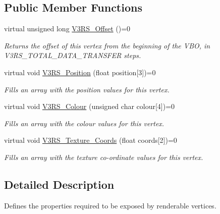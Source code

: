 \subsection*{Public Member Functions}
\begin{DoxyCompactItemize}
\item 
virtual unsigned long \hyperlink{class_i_vertex3_d_render_spec_a891d736d3d414de333398975f34bbae7}{V3\-R\-S\-\_\-\-Offset} ()=0
\begin{DoxyCompactList}\small\item\em Returns the offset of this vertex from the beginning of the V\-B\-O, in V3\-R\-S\-\_\-\-T\-O\-T\-A\-L\-\_\-\-D\-A\-T\-A\-\_\-\-T\-R\-A\-N\-S\-F\-E\-R steps. \end{DoxyCompactList}\item 
virtual void \hyperlink{class_i_vertex3_d_render_spec_a198bcfd0e8b6996848da0babe6805213}{V3\-R\-S\-\_\-\-Position} (float position\mbox{[}3\mbox{]})=0
\begin{DoxyCompactList}\small\item\em Fills an array with the position values for this vertex. \end{DoxyCompactList}\item 
virtual void \hyperlink{class_i_vertex3_d_render_spec_aaa32fb05761effc71596ee25c0eaaa77}{V3\-R\-S\-\_\-\-Colour} (unsigned char colour\mbox{[}4\mbox{]})=0
\begin{DoxyCompactList}\small\item\em Fills an array with the colour values for this vertex. \end{DoxyCompactList}\item 
virtual void \hyperlink{class_i_vertex3_d_render_spec_af9b255329a6ea9dd75e18699792b03e8}{V3\-R\-S\-\_\-\-Texture\-\_\-\-Coords} (float coords\mbox{[}2\mbox{]})=0
\begin{DoxyCompactList}\small\item\em Fills an array with the texture co-\/ordinate values for this vertex. \end{DoxyCompactList}\end{DoxyCompactItemize}


\subsection{Detailed Description}
Defines the properties required to be exposed by renderable vertices. 

